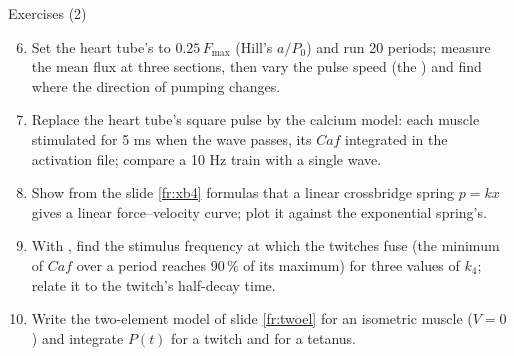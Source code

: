 \documentclass[aspectratio=169,11pt]{beamer}
\begin{document}
\begin{frame}{Exercises (2)}
\label{fr:exercises2}
\small
\begin{enumerate}
  \setcounter{enumi}{5}
  \item Set the heart tube's  to $0.25\,F_{\max}$ (Hill's $a/P_0$) and run 20 periods; measure the mean flux at three sections, then vary the pulse speed (the ) and find where the direction of pumping changes.
  \item Replace the heart tube's square pulse by the calcium model: each muscle stimulated for 5 ms when the wave passes, its $Caf$ integrated in the activation file; compare a 10 Hz train with a single wave.
  \item Show from the slide \ref{fr:xb4} formulas that a linear crossbridge spring $p = kx$ gives a linear force--velocity curve; plot it against the exponential spring's.
  \item With , find the stimulus frequency at which the twitches fuse (the minimum of $Caf$ over a period reaches 90\,\% of its maximum) for three values of $k_4$; relate it to the twitch's half-decay time.
  \item Write the two-element model of slide \ref{fr:twoel} for an isometric muscle ($V = 0$) and integrate $P(t)$ for a twitch and for a tetanus.
\end{enumerate}
\end{frame}
\end{document}
